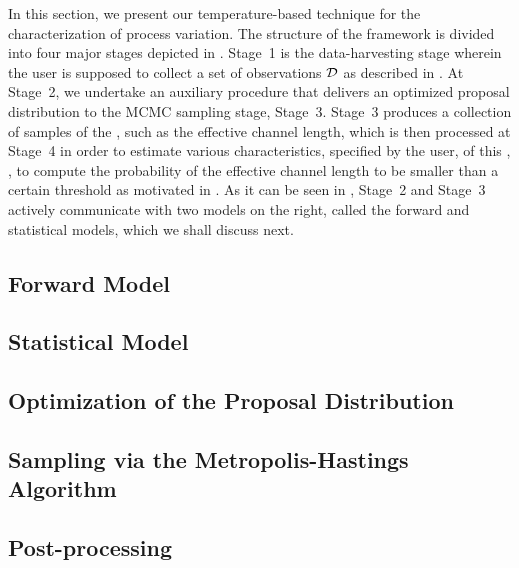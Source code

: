 
In this section, we present our temperature-based technique for the characterization of process variation. The structure of the framework is divided into four major stages depicted in .
Stage~1 is the data-harvesting stage wherein the user is supposed to collect a set of observations $\mathcal{D}$ as described in .
At Stage~2, we undertake an auxiliary procedure that delivers an optimized proposal distribution to the MCMC sampling stage, Stage~3.
Stage~3 produces a collection of samples of the \qoi, such as the effective channel length, which is then processed at Stage~4 in order to estimate various characteristics, specified by the user, of this \qoi, \eg, to compute the probability of the effective channel length to be smaller than a certain threshold as motivated in .
As it can be seen in , Stage~2 and Stage~3 actively communicate with two models on the right, called the forward and statistical models, which we shall discuss next.

\subsection{Forward Model}   


\subsection{Statistical Model} 


\subsection{Optimization of the Proposal Distribution} 


\subsection{Sampling via the Metropolis-Hastings Algorithm} 


\subsection{Post-processing} 

